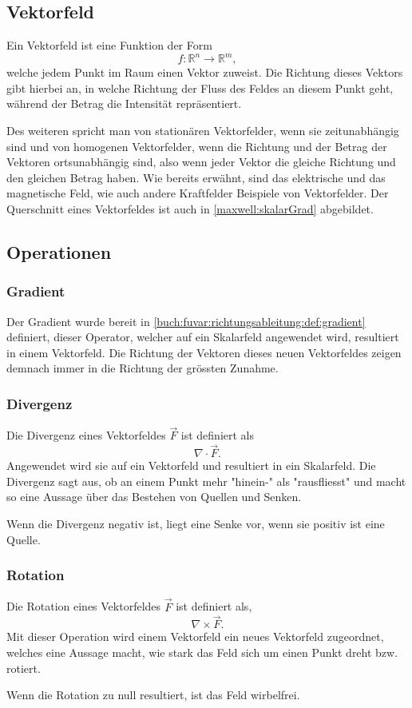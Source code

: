 \subsection{Vektorfeld\label{maxwell:vektorfeld}}

Ein Vektorfeld ist eine Funktion der Form \[ f: \mathbb{R}^n \rightarrow \mathbb{R}^m, \] welche jedem Punkt im Raum einen Vektor zuweist. 
Die Richtung dieses Vektors gibt hierbei an, in welche Richtung der Fluss des Feldes an diesem Punkt geht, während der Betrag die Intensität repräsentiert.


Des weiteren spricht man von stationären Vektorfelder, wenn sie zeitunabhängig sind und von homogenen Vektorfelder, wenn die Richtung und der Betrag der Vektoren ortsunabhängig sind, also wenn jeder Vektor die gleiche Richtung und den gleichen Betrag haben. 
Wie bereits erwähnt, sind das elektrische und das magnetische Feld, wie auch andere Kraftfelder Beispiele von Vektorfelder.
Der Querschnitt eines Vektorfeldes ist auch in \ref{maxwell:skalarGrad} abgebildet.

\subsection{Operationen}

\subsubsection*{Gradient}

Der Gradient wurde bereit in \ref{buch:fuvar:richtungsableitung:def:gradient} definiert, dieser Operator, welcher auf ein Skalarfeld angewendet wird, resultiert in einem Vektorfeld. 
Die Richtung der Vektoren dieses neuen Vektorfeldes zeigen demnach immer in die Richtung der grössten Zunahme.

\subsubsection*{Divergenz}

Die Divergenz eines Vektorfeldes $\vec{F}$ ist definiert als 
\[ \nabla\cdot\vec{F}. \]
Angewendet wird sie auf ein Vektorfeld und resultiert in ein Skalarfeld.
Die Divergenz sagt aus, ob an einem Punkt mehr "hinein-" als "rausfliesst" und macht so eine Aussage über das Bestehen von Quellen und Senken.

Wenn die Divergenz negativ ist, liegt eine Senke vor, wenn sie positiv ist eine Quelle. 

\subsubsection*{Rotation}
Die Rotation eines Vektorfeldes $\vec{F}$ ist definiert als,
\[ \nabla\times\vec{F}. \]
Mit dieser Operation wird einem Vektorfeld ein neues Vektorfeld zugeordnet, welches eine Aussage macht, wie stark das Feld sich um einen Punkt dreht bzw. rotiert.

Wenn die Rotation zu null resultiert, ist das Feld wirbelfrei.

